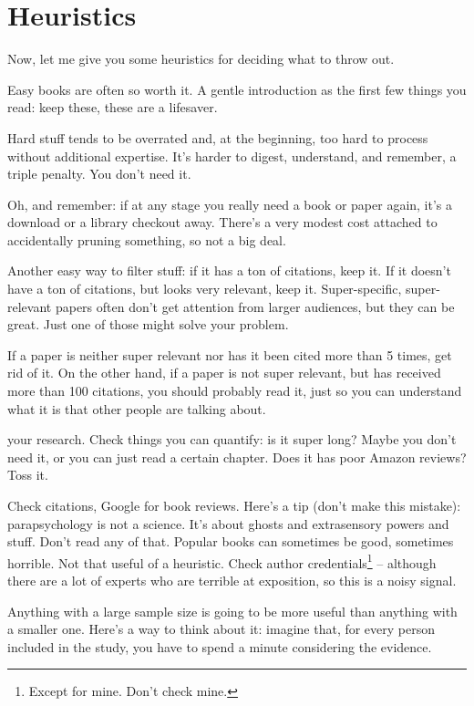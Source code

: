 \section{Heuristics}

Now, let me give you some heuristics for deciding what to throw out.

Easy books are often so worth it. A gentle introduction as the first few things
you read: keep these, these are a lifesaver.

Hard stuff tends to be overrated and, at the beginning, too hard to process
without additional expertise. It's harder to digest, understand, and
remember, a triple penalty. You don't need it.

Oh, and remember: if at any stage you really need a book or paper again, it's a
download or a library checkout away. There's a very modest cost attached to
accidentally pruning something, so not a big deal.

Another easy way to filter stuff: if it has a ton of citations, keep it. If it
doesn't have a ton of citations, but looks very relevant, keep
it. Super-specific, super-relevant papers often don't get attention from
larger audiences, but they can be great. Just one of those might solve
your problem.

If a paper is neither super relevant nor has it been cited more than 5 times, get rid
of it. On the other hand, if a paper is not super relevant, but has received
more than 100 citations, you should probably read it, just so you can understand
what it is that other people are talking about. 

 your research. Check things you can quantify: is it
super long? Maybe you don't need it, or you can just read a certain
chapter. Does it has poor Amazon reviews? Toss it.

Check citations, Google for book reviews. Here's a tip (don't make this mistake):
parapsychology is not a science. It's about ghosts and extrasensory powers
and stuff. Don't read any of that.
Popular books can sometimes be good, sometimes horrible. Not that useful of a heuristic. Check author credentials\footnote{Except for mine. Don't check mine.} -- although there are a lot of experts who
are terrible at exposition, so this is a noisy signal. 

 Anything with a large sample size is going to be more useful
than anything with a smaller one. Here's a way to think about it: imagine that,
for every person included in the study, you have to spend a minute considering the evidence.


